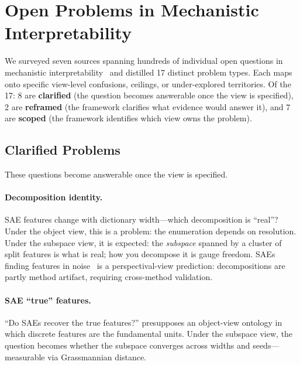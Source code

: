 \documentclass{article}
\begin{document}
\section{Open Problems in Mechanistic Interpretability}\label{app:openprobs}

We surveyed seven sources spanning hundreds of individual open questions
in mechanistic interpretability~\citep{sharkey2025,nanda2022open,
apollo2024,schmidt2026,steinhardt2026,williams2025,mib2025}
and distilled 17 distinct problem types.  Each maps onto specific
view-level confusions, ceilings, or under-explored territories.
Of the 17: 8 are \textbf{clarified} (the question becomes answerable once the
view is specified), 2 are \textbf{reframed} (the framework clarifies what
evidence would answer it), and 7 are \textbf{scoped} (the framework
identifies which view owns the problem).

\subsection{Clarified Problems}

These questions become answerable once the view is specified.

\paragraph{Decomposition identity.}
SAE features change with dictionary width---which decomposition is
``real''?  Under the object view, this is a problem: the enumeration
depends on resolution.  Under the subspace view, it is expected: the
\emph{subspace} spanned by a cluster of split features is what is
real; how you decompose it is gauge freedom.  SAEs finding features
in noise~\citep{leask2025} is a perspectival-view prediction:
decompositions are partly method artifact, requiring cross-method
validation.

\paragraph{SAE ``true'' features.}
``Do SAEs recover the true features?'' presupposes an object-view
ontology in which discrete features are the fundamental units.  Under
the subspace view, the question becomes whether the subspace converges
across widths and seeds---measurable via Grassmannian distance.
\end{document}
